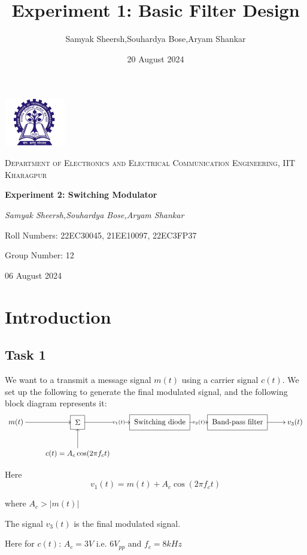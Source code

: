 \documentclass{article}
\title{Experiment 1: Basic Filter Design}
\author{Samyak Sheersh,Souhardya Bose,Aryam Shankar}
\date{20 August 2024}
\begin{document}
\begin{titlepage}
    \centering
    \includegraphics[width=0.2\textwidth]{KGP_logo.png}\par\vspace{1cm}
    {\scshape\LARGE Department of Electronics and Electrical Communication Engineering, IIT Kharagpur\par}
    \vspace{1cm}
    {\huge\bfseries Experiment 2: Switching Modulator\par}
    \vspace{1.5cm}
    {\Large\itshape Samyak Sheersh,Souhardya Bose,Aryam Shankar\par}
    \vfill
    {\large Roll Numbers: 22EC30045, 21EE10097, 22EC3FP37\par}
    {\large Group Number: 12\par}
    \vfill
    {\large 06 August 2024\par}
\end{titlepage}


\section{Introduction}

\subsection{Task 1}
We want to a transmit a message signal $m(t)$ using a carrier signal $c(t)$. We set up the following to generate the final modulated signal, and the following block diagram represents it:
\[\xymatrix{
    m(t) \ar[r] & *++[F]{\Sigma} \ar[r]|{v_1(t)} & *++[F]{\text{Switching diode}} \ar[r]|{v_2(t)} & *++[F]{\text{Band-pass filter}} \ar[r] & v_3(t)\\
& c(t)=A_c \cos(2\pi f_c t) \ar[u]
}\]

Here $$v_1(t) = m(t)+A_c \cos(2\pi f_c t)$$

where $A_c >|m(t)|$

The signal $v_3(t)$ is the final modulated signal. 
\vspace{2mm}

Here for $c(t)$: $A_c=3V$ i.e. $6V_{pp}$ and $f_c=8kHz$
\end{document}
